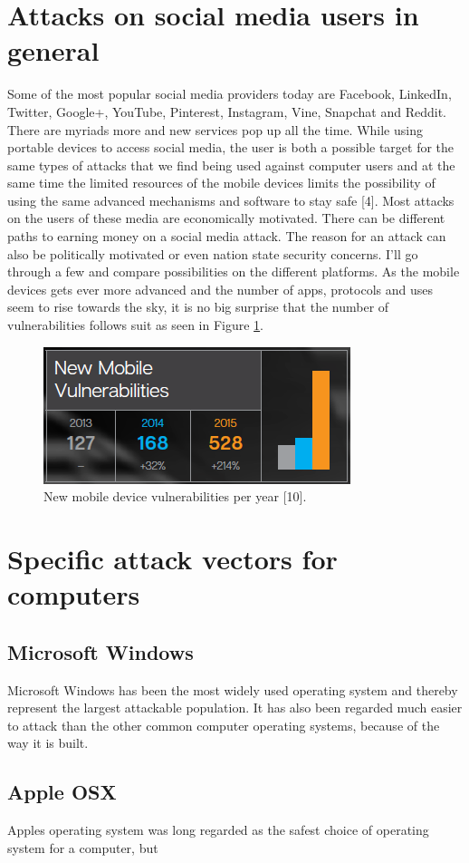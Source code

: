 \section{Attacks on social media users in general}
Some of the most popular social media providers today are Facebook, LinkedIn, Twitter, Google+, YouTube, Pinterest, Instagram, Vine, Snapchat and Reddit. There are myriads more and new services pop up all the time.
While using portable devices to access social media, the user is both a possible target for the same types of attacks that we find being used against computer users and at the same time the limited resources of the mobile devices limits the possibility of using the same advanced mechanisms and software to stay safe [4].
Most attacks on the users of these media are economically motivated. There can be different paths to earning money on a social media attack. The reason for an attack can also be politically motivated or even nation state security concerns. I’ll go through a few and compare possibilities on the different platforms.
As the mobile devices gets ever more advanced and the number of apps, protocols and uses seem to rise towards the sky, it is no big surprise that the number of vulnerabilities follows suit as seen in Figure \ref{fig:mobile_vulnerabilities}.
\begin{figure}
\centering
\includegraphics[width=0.5 \textwidth]{fig/mobile_vulnerabilities}
\caption{New mobile device vulnerabilities per year [10].\label{fig:mobile_vulnerabilities}}
\end{figure}
\section{Specific attack vectors for computers}
\subsection{Microsoft Windows}
Microsoft Windows has been the most widely used operating system and thereby represent the largest attackable population. It has also been regarded much easier to attack than the other common computer operating systems, because of the way it is built. 
\subsection{Apple OSX}
Apples operating system was long regarded as the safest choice of operating system for a computer, but 
